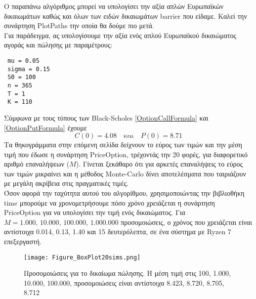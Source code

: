 \documentclass[12pt,a4paper,twoside,openany]{book}
\begin{document}
 	\vspace{4mm}
 	Ο παραπάνω αλγόριθμος μπορεί να υπολογίσει την αξία απλών Ευρωπαϊκών δικαιωμάτων καθώς και όλων των ειδών δικαιωμάτων barrier που είδαμε. Καλεί την συνάρτηση PlotPaths την οποία θα δούμε πιο μετά.
 	\vspace{2.5mm}\\
 	Για παράδειγμα, ας υπολογίσουμε την αξία ενός απλού Ευρωπαϊκού δικαιώματος αγοράς και πώλησης με παραμέτρους:
 	\vspace{4mm}
 \begin{lstlisting}
 mu = 0.05
 sigma = 0.15
 S0 = 100
 n = 365
 T = 1
 K = 110 \end{lstlisting}
 	\vspace{4mm}
 	Σύμφωνα με τους τύπους των Black-Scholes \eqref{OptionCallFormula} και \eqref{OptionPutFormula} έχουμε \[C(0)= 4.08 \quad\text{και}\quad P(0)= 8.71 \]
 	Τα θηκογράμματα στην επόμενη σελίδα δείχνουν το εύρος των τιμών και την μέση τιμή που έδωσε η συνάρτηση PriceOption, τρέχοντάς την 20 φορές, για διαφορετικό αριθμό επαναλήψεων ($Μ$). Γίνεται ξεκάθαρο ότι για αρκετές επαναλήψεις το εύρος των τιμών μικραίνει και η μέθοδος Monte-Carlo δίνει αποτελέσματα που ταιριάζουν με μεγάλη ακρίβεια στις πραγματικές τιμές.
 	\vspace{2.5mm}\\
 	Όσον αφορά την ταχύτητα αυτού του αλγορίθμου, χρησιμοποιώντας την βιβλιοθήκη time μπορούμε να χρονομετρήσουμε πόσο χρόνο χρειάζεται η συνάρτηση PriceOption για να υπολογίσει την τιμή ενός δικαιώματος. Για $M=1.000,\, 10.000,\, 100.000,\, 1.000.000$ προσομοιώσεις, ο χρόνος που χρειάζεται είναι αντίστοιχα 0.014, 0.13, 1.40 και 15 δευτερόλεπτα, σε ένα σύστημα με Ryzen 7 επεξεργαστή.
 	
 	\begin{figure}[h!]
 		\vspace{7mm}
 		\centering
 		\texttt{[image: Figure\_BoxPlot20sims.png]}
 		\caption{Προσομοιώσεις για το δικαίωμα πώλησης. Η μέση τιμή στις 100, 1.000, 10.000, 100.000,  προσομοιώσεις είναι αντίστοιχα 8.423, 8.720, 8.705, 8.712 }
 		\label{fig:BoxPlotPut}
 	\end{figure}
 	
\end{document}
